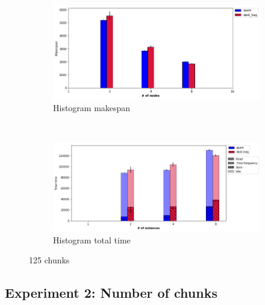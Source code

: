 \documentclass[conference]{IEEEtran}
\begin{document}
\begin{figure}[!t]
    \centering
    \begin{subfigure}[b]{\columnwidth}
        \includegraphics[clip,width=\columnwidth]{images/histo_instance.png}%
        \caption{Histogram makespan}\label{fig:histo_ms_worker}
    \end{subfigure}
    \\
    \begin{subfigure}[b]{\columnwidth}
        \includegraphics[clip,width=\columnwidth]{images/histo_idle_instances.png}%
        \caption{Histogram total time}\label{fig:histo_tt_worker}
    \end{subfigure}
    \caption{125 chunks}
\end{figure}

\subsection{Experiment 2: Number of chunks}
\end{document}
